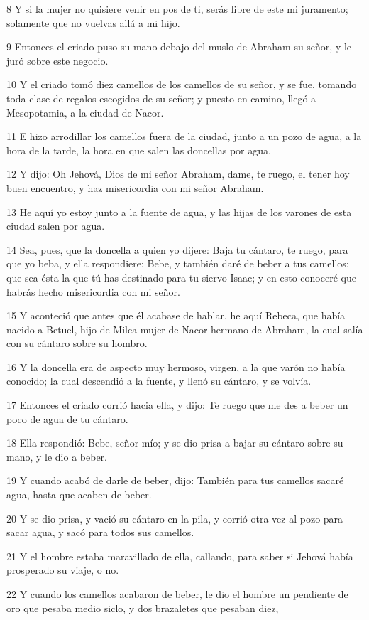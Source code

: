 8 Y si la mujer no quisiere venir en pos de ti, serás libre de este mi juramento; solamente que no vuelvas allá a mi hijo.

9 Entonces el criado puso su mano debajo del muslo de Abraham su señor, y le juró sobre este negocio.

10 Y el criado tomó diez camellos de los camellos de su señor, y se fue, tomando toda clase de regalos escogidos de su señor; y puesto en camino, llegó a Mesopotamia, a la ciudad de Nacor.

11 E hizo arrodillar los camellos fuera de la ciudad, junto a un pozo de agua, a la hora de la tarde, la hora en que salen las doncellas por agua.

12 Y dijo: Oh Jehová, Dios de mi señor Abraham, dame, te ruego, el tener hoy buen encuentro, y haz misericordia con mi señor Abraham.

13 He aquí yo estoy junto a la fuente de agua, y las hijas de los varones de esta ciudad salen por agua.

14 Sea, pues, que la doncella a quien yo dijere: Baja tu cántaro, te ruego, para que yo beba, y ella respondiere: Bebe, y también daré de beber a tus camellos; que sea ésta la que tú has destinado para tu siervo Isaac; y en esto conoceré que habrás hecho misericordia con mi señor.

15 Y aconteció que antes que él acabase de hablar, he aquí Rebeca, que había nacido a Betuel, hijo de Milca mujer de Nacor hermano de Abraham, la cual salía con su cántaro sobre su hombro.

16 Y la doncella era de aspecto muy hermoso, virgen, a la que varón no había conocido; la cual descendió a la fuente, y llenó su cántaro, y se volvía.

17 Entonces el criado corrió hacia ella, y dijo: Te ruego que me des a beber un poco de agua de tu cántaro.

18 Ella respondió: Bebe, señor mío; y se dio prisa a bajar su cántaro sobre su mano, y le dio a beber.

19 Y cuando acabó de darle de beber, dijo: También para tus camellos sacaré agua, hasta que acaben de beber.

20 Y se dio prisa, y vació su cántaro en la pila, y corrió otra vez al pozo para sacar agua, y sacó para todos sus camellos.

21 Y el hombre estaba maravillado de ella, callando, para saber si Jehová había prosperado su viaje, o no.

22 Y cuando los camellos acabaron de beber, le dio el hombre un pendiente de oro que pesaba medio siclo, y dos brazaletes que pesaban diez,

